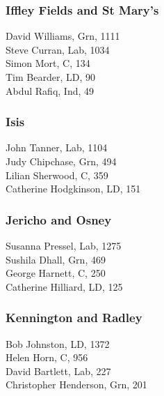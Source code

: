 \documentclass[a4paper,openany,10pt]{book}
\begin{document}
\subsubsection*{Iffley Fields and St Mary's}



David Williams, Grn, 1111\\
Steve Curran, Lab, 1034\\
Simon Mort, C, 134\\
Tim Bearder, LD, 90\\
Abdul Rafiq, Ind, 49\\


\subsubsection*{Isis}



John Tanner, Lab, 1104\\
Judy Chipchase, Grn, 494\\
Lilian Sherwood, C, 359\\
Catherine Hodgkinson, LD, 151\\


\subsubsection*{Jericho and Osney}



Susanna Pressel, Lab, 1275\\
Sushila Dhall, Grn, 469\\
George Harnett, C, 250\\
Catherine Hilliard, LD, 125\\


\subsubsection*{Kennington and Radley}



Bob Johnston, LD, 1372\\
Helen Horn, C, 956\\
David Bartlett, Lab, 227\\
Christopher Henderson, Grn, 201\\
\end{document}
